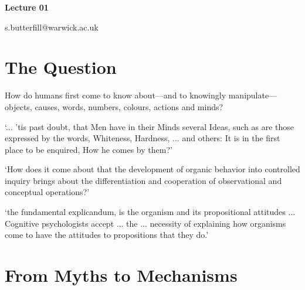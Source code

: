 \documentclass[12pt]{extarticle}
\date{}
\makeatletter
\def \ititle {Origins of Mind}
\def \iemail{s.butterfill@warwick.ac.uk}
\makeatother
\begin{document}
\begin{multicols}{3}

\setlength\footnotesep{1em}










\def \ititle {Lecture 01}

\begin{center}

{\Large

\textbf{\ititle}

}



\iemail %

\end{center}



\section{The Question}

How do humans first come to know  about---and to knowingly manipulate---objects,
causes, words, numbers, colours, actions and minds?

‘... ’tis past doubt, that Men have in their Minds several Ideas, such as are those expressed by the words, Whiteness, Hardness, ... and others: It is in the first place to be enquired, How he comes by them?’
\citep[p.\ 104]{Locke:1975qo}

‘How does it come about that the development of organic behavior into controlled inquiry brings about the differentiation and cooperation of observational and conceptual operations?’
\citep[p.\ 12]{Dewey:1938yp}

‘the fundamental explicandum, is the organism and its propositional attitudes ... Cognitive psychologists accept ... the  ... necessity of explaining how organisms come to have the attitudes to propositions that they do.’
\citep[p.\ 198]{Fodor:1975pb}



\section{From Myths to Mechanisms}


\end{multicols}
\end{document}
